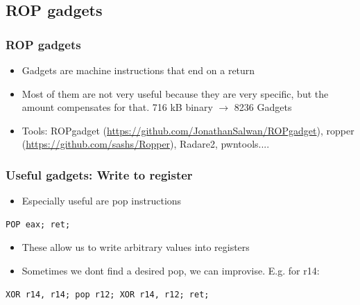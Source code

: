 \documentclass[11pt]{beamer}
\begin{document}
\subsection{ROP gadgets}
\begin{frame}
    \frametitle{ROP gadgets}
    \begin{itemize}
        \item Gadgets are machine instructions that end on a return
        \item Most of them are not very useful because they are very specific, but the amount compensates for that. 716 kB binary $\rightarrow$ 8236 Gadgets
        \item Tools: ROPgadget (\url{https://github.com/JonathanSalwan/ROPgadget}), ropper (\url{https://github.com/sashs/Ropper}), Radare2, pwntools....
    \end{itemize}

\end{frame}

\begin{frame}[fragile]
    \frametitle{Useful gadgets: Write to register}
    \begin{itemize}
        \item Especially useful are pop instructions
    \end{itemize}
\begin{lstlisting}[style=result]
POP eax; ret;
\end{lstlisting}
    \begin{itemize}
        \item These allow us to write arbitrary values into registers
        \item Sometimes we dont find a desired pop, we can improvise. E.g. for r14:
    \end{itemize}
\begin{lstlisting}[style=result]
XOR r14, r14; pop r12; XOR r14, r12; ret;
\end{lstlisting}
\end{frame}
\end{document}
